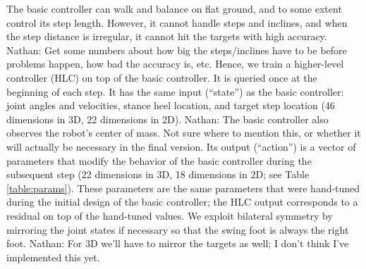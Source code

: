\documentclass[a4paper]{article}
\newcommand{\nhatch}[1]{{\leavevmode\color{blue} Nathan: #1}}
\begin{document}
The basic controller can walk and balance on flat ground, and to some extent control its step length.
However, it cannot handle steps and inclines, and when the step distance is irregular, it cannot hit the targets with high accuracy.
\nhatch{Get some numbers about how big the steps/inclines have to be before problems happen, how bad the accuracy is, etc.}
Hence, we train a higher-level controller (HLC) on top of the basic controller.
It is queried once at the beginning of each step.
It has the same input (``state'') as the basic controller: joint angles and velocities, stance heel location, and target step location (46 dimensions in 3D, 22 dimensions in 2D).
\nhatch{The basic controller also observes the robot's center of mass. Not sure where to mention this, or whether it will actually be necessary in the final version.}
Its output (``action'') is a vector of parameters that modify the behavior of the basic controller during the subsequent step (22 dimensions in 3D, 18 dimensions in 2D; see Table \ref{table:params}).
These parameters are the same parameters that were hand-tuned during the initial design of the basic controller; the HLC output corresponds to a residual on top of the hand-tuned values.
We exploit bilateral symmetry by mirroring the joint states if necessary so that the swing foot is always the right foot.
\nhatch{For 3D we'll have to mirror the targets as well; I don't think I've implemented this yet.}
\end{document}
